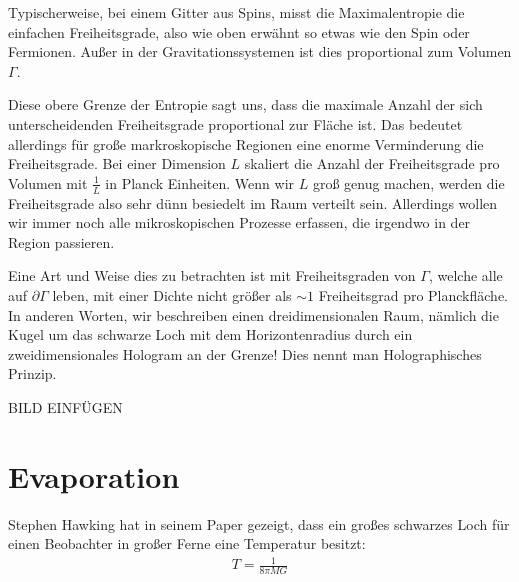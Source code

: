 \documentclass[ngerman]{scrartcl}
\begin{document}
Typischerweise, bei einem Gitter aus Spins, misst die Maximalentropie die einfachen Freiheitsgrade, also wie oben erwähnt so etwas wie den Spin oder Fermionen. Außer in der Gravitationssystemen ist dies proportional zum Volumen $\Gamma$. 

Diese obere Grenze der Entropie sagt uns, dass die maximale Anzahl der sich unterscheidenden Freiheitsgrade proportional zur Fläche ist. Das bedeutet allerdings für große markroskopische Regionen eine enorme Verminderung die Freiheitsgrade. Bei einer Dimension $L$ skaliert die Anzahl der Freiheitsgrade pro Volumen mit $\frac{1}{L}$ in Planck Einheiten.
Wenn wir $L$ groß genug machen, werden die Freiheitsgrade also sehr dünn besiedelt im Raum verteilt sein. Allerdings wollen wir immer noch alle mikroskopischen Prozesse erfassen, die irgendwo in der Region passieren. 

Eine Art und Weise dies zu betrachten ist mit Freiheitsgraden von $\Gamma$, welche alle auf $\partial \Gamma$ leben, mit einer Dichte nicht größer als $\sim 1$ Freiheitsgrad pro Planckfläche. In anderen Worten, wir beschreiben einen dreidimensionalen Raum, nämlich die Kugel um das schwarze Loch mit dem Horizontenradius durch ein zweidimensionales Hologram an der Grenze! Dies nennt man Holographisches Prinzip. 

BILD EINFÜGEN   

\section{Evaporation}
Stephen Hawking hat in seinem Paper \cite{ParticleCreation} gezeigt, dass ein großes schwarzes Loch für einen Beobachter in großer Ferne eine Temperatur besitzt:
\begin{align}
T = \frac{1}{8 \pi MG}
\end{align}
\end{document}
